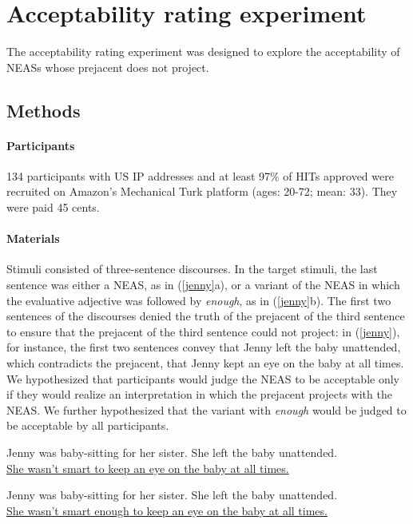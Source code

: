\documentclass[11pt,fleqn]{article}
\newcommand{\6}{\mbox{$[\hspace*{-.6mm}[$}}
\newcommand{\9}{\mbox{$]\hspace*{-.6mm}]$}}
\begin{document}
\appendix

\section{Acceptability rating experiment}\label{s-acc}

The acceptability rating experiment was designed to explore the acceptability of  NEASs whose prejacent does not project. 

\subsection{Methods}

\paragraph{Participants} 134 participants with US IP addresses and at least 97\% of HITs approved were recruited on Amazon's Mechanical Turk platform (ages: 20-72; mean: 33). They were paid 45 cents.

\paragraph{Materials} Stimuli consisted of three-sentence discourses. In the target stimuli, the last sentence was either a NEAS, as in (\ref{jenny}a), or a variant of the NEAS in which the evaluative adjective was followed by {\em enough}, as in (\ref{jenny}b). The first two sentences of the discourses denied the truth of the prejacent of the third sentence to ensure that the prejacent of the third sentence could not project: in (\ref{jenny}), for instance, the first two sentences convey that Jenny left the baby unattended, which contradicts the prejacent, that Jenny kept an eye on the baby at all times. We hypothesized that participants would judge the NEAS to be acceptable only if they would realize an interpretation in which the prejacent projects with the NEAS. We further hypothesized that the variant with {\em enough} would be judged to be acceptable by all participants.

\begin{exe} 
\ex\label{jenny} 
\begin{xlist}
\ex Jenny was baby-sitting for her sister. She
left the baby unattended. \\ \underline{She wasn't smart to keep an eye on the baby at all times.} 

\ex Jenny was baby-sitting for her sister. She
left the baby unattended. \\ \underline{She wasn't smart enough to keep an eye on the baby at all times.} 

\end{xlist}
\end{exe} 
\end{document}
